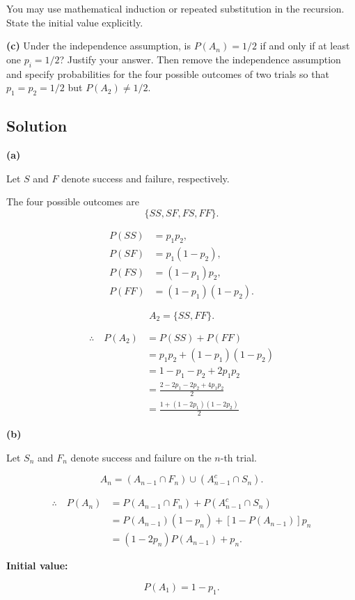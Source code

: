 \documentclass[11pt,a4paper]{article}
\begin{document}
You may use mathematical induction or repeated substitution
in the recursion. State the initial value explicitly.

\textbf{(c)}
Under the independence assumption, is
$P(A_n)=1/2$ if and only if at least one $p_i=1/2$?
Justify your answer.
Then remove the independence assumption and specify
probabilities for the four possible outcomes of two trials
so that $p_1=p_2=1/2$ but $P(A_2)\neq 1/2$.


\subsection*{Solution}

\textbf{(a)}

Let $S$ and $F$ denote success and failure,
respectively.

The four possible outcomes are
\[
\{SS,SF,FS,FF\}.
\]

\[
\begin{aligned}
P(SS)&=p_1p_2,\\
P(SF)&=p_1(1-p_2),\\
P(FS)&=(1-p_1)p_2,\\
P(FF)&=(1-p_1)(1-p_2).
\end{aligned}
\]

\[
A_2=\{SS,FF\}.
\]

\[
\begin{aligned}
\therefore\quad P(A_2)
&=P(SS)+P(FF)\\
&=p_1p_2+(1-p_1)(1-p_2)\\
&=1-p_1-p_2+2p_1p_2\\
&=\frac{2-2p_1-2p_2+4p_1p_2}{2}\\
&=
\frac{1+(1-2p_1)(1-2p_2)}{2}
\end{aligned}
\]



\textbf{(b)}

Let $S_n$ and $F_n$ denote success and failure
on the $n$-th trial.

\[
A_n=
(A_{n-1}\cap F_n)
\cup
(A_{n-1}^{c}\cap S_n).
\]

\[
\begin{aligned}
\therefore\quad P(A_n)
&=P(A_{n-1}\cap F_n)
 +P(A_{n-1}^{c}\cap S_n)\\
&=P(A_{n-1})(1-p_n)
 +[1-P(A_{n-1})]p_n\\
&=(1-2p_n)P(A_{n-1})+p_n.
\end{aligned}
\]

\textbf{Initial value:}

\[
P(A_1)=1-p_1.
\]
\end{document}
